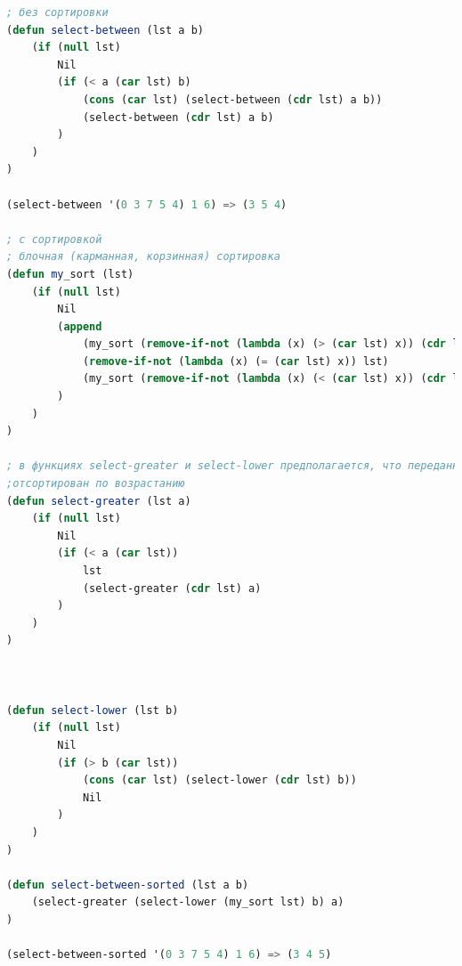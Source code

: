 \documentclass[12pt]{report}
\begin{document}
\begin{lstlisting}[language=Lisp]
; без сортировки
(defun select-between (lst a b)
	(if (null lst)
		Nil
		(if (< a (car lst) b)
			(cons (car lst) (select-between (cdr lst) a b))
			(select-between (cdr lst) a b)
		)
	)
)

(select-between '(0 3 7 5 4) 1 6) => (3 5 4)

; с сортировкой
; блочная (карманная, корзинная) сортировка
(defun my_sort (lst)
	(if (null lst)
		Nil
		(append 
			(my_sort (remove-if-not (lambda (x) (> (car lst) x)) (cdr lst)))
			(remove-if-not (lambda (x) (= (car lst) x)) lst)
			(my_sort (remove-if-not (lambda (x) (< (car lst) x)) (cdr lst)))
		)
	)
)

; в функциях select-greater и select-lower предполагается, что переданный список 
;отсортирован по возрастанию
(defun select-greater (lst a)
	(if (null lst)
		Nil
		(if (< a (car lst))
			lst
			(select-greater (cdr lst) a)
		)
	)
)



(defun select-lower (lst b)
	(if (null lst)
		Nil
		(if (> b (car lst))
			(cons (car lst) (select-lower (cdr lst) b))
			Nil
		)
	)
)

(defun select-between-sorted (lst a b)	
	(select-greater (select-lower (my_sort lst) b) a)	
)

(select-between-sorted '(0 3 7 5 4) 1 6) => (3 4 5)

\end{lstlisting}

	

	
\end{document}
